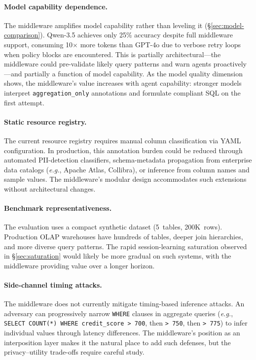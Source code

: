\documentclass[sigconf, nonacm]{acmart}
\newcommand{\eg}{\textit{e.g.}\xspace}
\begin{document}
\paragraph{Model capability dependence.}
The middleware amplifies model capability rather than leveling it
(\S\ref{sec:model-comparison}).  Qwen-3.5 achieves only 25\% accuracy
despite full middleware support, consuming 10$\times$ more tokens than
GPT-4o due to verbose retry loops when policy blocks are encountered.
This is partially architectural---the middleware could pre-validate likely
query patterns and warn agents proactively---and partially a function of
model capability.  As the model quality dimension shows, the middleware's
value increases with agent capability: stronger models interpret
\texttt{aggregation\_only} annotations and formulate compliant SQL on the
first attempt.

\paragraph{Static resource registry.}
The current resource registry requires manual column classification via
YAML configuration.  In production, this annotation burden could be reduced
through automated PII-detection classifiers, schema-metadata propagation
from enterprise data catalogs (\eg, Apache Atlas, Collibra), or inference
from column names and sample values.  The middleware's modular design
accommodates such extensions without architectural changes.

\paragraph{Benchmark representativeness.}
The evaluation uses a compact synthetic dataset (5~tables, 200K~rows).
Production OLAP warehouses have hundreds of tables, deeper join hierarchies,
and more diverse query patterns.  The rapid session-learning saturation
observed in \S\ref{sec:saturation} would likely be more gradual on such
systems, with the middleware providing value over a longer horizon.

\paragraph{Side-channel timing attacks.}
The middleware does not currently mitigate timing-based inference attacks.
An adversary can progressively narrow \texttt{WHERE} clauses in aggregate
queries (\eg, \texttt{SELECT COUNT(*) WHERE credit\_score > 700}, then
\texttt{> 750}, then \texttt{> 775}) to infer individual values through
latency differences.  The middleware's position as an interposition layer
makes it the natural place to add such defenses, but the privacy--utility
trade-offs require careful study.
\end{document}
